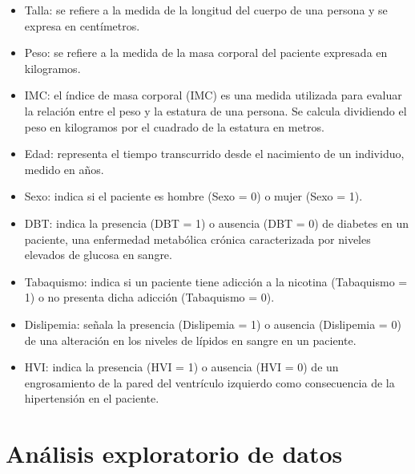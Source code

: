 \begin{itemize}
  \item Talla: se refiere a la medida de la longitud del cuerpo de una persona y se expresa en centímetros.
  \item Peso: se refiere a la medida de la masa corporal del paciente expresada en kilogramos.
  \item IMC: el índice de masa corporal (IMC) es una medida utilizada para evaluar la relación entre el peso y la estatura de una persona. Se calcula dividiendo el peso en kilogramos por el cuadrado de la estatura en metros.
  \item Edad: representa el tiempo transcurrido desde el nacimiento de un individuo, medido en años.
  \item Sexo: indica si el paciente es hombre (Sexo = 0) o mujer (Sexo = 1).
  \item DBT: indica la presencia (DBT = 1) o ausencia (DBT = 0) de diabetes en un paciente, una enfermedad metabólica crónica caracterizada por niveles elevados de glucosa en sangre.
  \item Tabaquismo: indica si un paciente tiene adicción a la nicotina (Tabaquismo = 1) o no presenta dicha adicción (Tabaquismo = 0).
  \item Dislipemia: señala la presencia (Dislipemia = 1) o ausencia (Dislipemia = 0) de una alteración en los niveles de lípidos en sangre en un paciente.
  \item HVI: indica la presencia (HVI = 1) o ausencia (HVI = 0) de un engrosamiento de la pared del ventrículo izquierdo como consecuencia de la hipertensión en el paciente.
\end{itemize}

\section{Análisis exploratorio de datos}
 